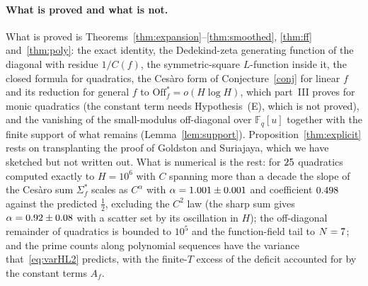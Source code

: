 \documentclass[11pt,a4paper]{article}
\theoremstyle{remark}\newtheorem{remark}[theorem]{Remark}
\newcommand{\F}{\mathbb{F}}
\begin{document}
\paragraph{What is proved and what is not.} What is proved is Theorems~\ref{thm:expansion}--\ref{thm:smoothed}, \ref{thm:ff} and~\ref{thm:poly}:
the exact identity, the Dedekind-zeta generating function of the diagonal with residue $1/C(f)$, the
symmetric-square $L$-function inside it, the closed formula for quadratics, the Ces\`aro form of
Conjecture~\ref{conj} for linear $f$ and its reduction for general $f$ to $\mathrm{Off}^\ast_f=o(H\log H)$, which part~III proves for monic quadratics
(the constant term needs Hypothesis~(E), which is not proved), and the vanishing of the small-modulus off-diagonal over
$\F_q[u]$ together with the finite support of what remains (Lemma~\ref{lem:support}). Proposition~\ref{thm:explicit} rests on transplanting the proof of Goldston and Suriajaya,
which we have sketched but not written out. What is numerical is the rest: for $25$ quadratics computed
exactly to $H=10^6$ with $C$ spanning more than a decade the slope of the Ces\`aro sum $\Sigma^\ast_f$ scales as
$C^{\alpha}$ with $\alpha=1.001\pm0.001$ and coefficient $0.498$ against the predicted $\tfrac12$,
excluding the $C^2$ law (the sharp sum gives $\alpha=0.92\pm0.08$ with a scatter set by its
oscillation in $H$); the off-diagonal remainder of
quadratics is bounded to $10^5$ and the function-field tail to $N=7$; and the prime counts along
polynomial sequences have the variance that~\eqref{eq:varHL2} predicts, with the finite-$T$ excess of the
deficit accounted for by the constant terms $A_f$.
\end{document}
